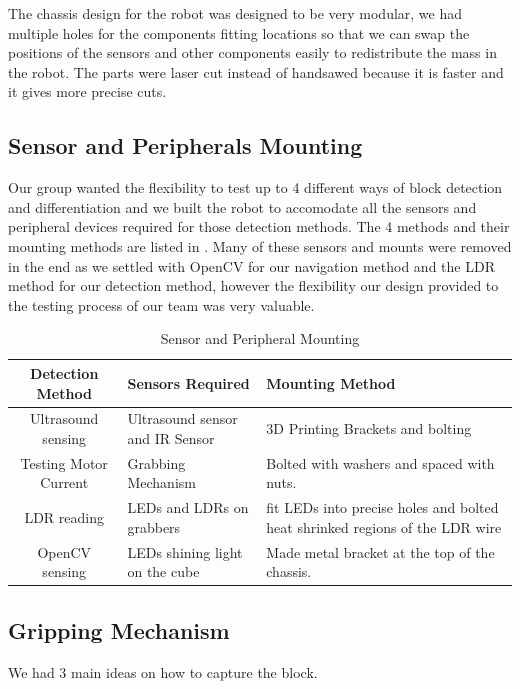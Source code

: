 \documentclass{article}
\begin{document}
The chassis design for the robot was designed to be very modular, we had multiple holes for the components fitting locations so that we can swap the positions of the sensors and other components easily to redistribute the mass in the robot. The parts were laser cut instead of handsawed because it is faster and it gives more precise cuts.

\subsection{Sensor and Peripherals Mounting}
\quad Our group wanted the flexibility to test up to 4 different ways of block detection and differentiation and we built the robot to accomodate all the sensors and peripheral devices required for those detection methods. The 4 methods and their mounting methods are listed in . Many of these sensors and mounts were removed in the end as we settled with OpenCV for our navigation method and the LDR method for our detection method, however the flexibility our design provided to the testing process of our team was very valuable.

\begin{table}[]
    \centering
    \begin{tabular}{|c|p{5cm}|p{5cm}|}
        \hline
        Detection Method & Sensors Required & Mounting Method \\
        \hline
        Ultrasound sensing & Ultrasound sensor and IR Sensor & 3D Printing Brackets and bolting \\
        \hline
        Testing Motor Current & Grabbing Mechanism & Bolted with washers and spaced with nuts.\\
        \hline
        LDR reading & LEDs and LDRs on grabbers & fit LEDs into precise holes and bolted heat shrinked regions of the LDR wire \\
        \hline
        OpenCV sensing & LEDs shining light on the cube & Made metal bracket at the top of the chassis.\\
        \hline
    \end{tabular}
    \caption{Sensor and Peripheral Mounting}
    \label{tab:mount_sens}
\end{table}

\subsection{Gripping Mechanism}
\quad We had 3 main ideas on how to capture the block. 
\end{document}
